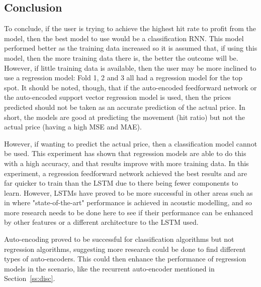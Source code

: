 \documentclass[11pt,a4paper]{article}
\numberwithin{equation}{section}
\begin{document}
\subsection{Conclusion}
\label{ss:cc}
To conclude, if the user is trying to achieve the highest hit rate to profit from the model, then the best model to use would be a classification RNN. This model performed better as the training data increased so it is assumed that, if using this model, then the more training data there is, the better the outcome will be. However, if little training data is available, then the user may be more inclined to use a regression model: Fold 1, 2 and 3 all had a regression model for the top spot. It should be noted, though, that if the auto-encoded feedforward network or the auto-encoded support vector regression model is used, then the prices predicted should not be taken as an accurate prediction of the actual price. In short, the models are good at predicting the movement (hit ratio) but not the actual price (having a high MSE and MAE).

However, if wanting to predict the actual price, then a classification model cannot be used. This experiment has shown that regression models are able to do this with a high accuracy, and that results improve with more training data. In this experiment, a regression feedforward network achieved the best results and are far quicker to train than the LSTM due to there being fewer components to learn. However, LSTMs have proved to be more successful in other areas such as in \cite{sakda} where "state-of-the-art"\cite{sakda} performance is achieved in acoustic modelling, and so more research needs to be done here to see if their performance can be enhanced by other features or a different architecture to the LSTM used.

Auto-encoding proved to be successful for classification algorithms but not regression algorithms, suggesting more research could be done to find different types of auto-encoders. This could then enhance the performance of regression models in the scenario, like the recurrent auto-encoder mentioned in Section~\ref{ss:disc}.
\end{document}
